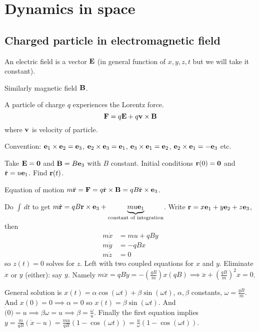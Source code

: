 \documentclass[10pt, a4paper]{article}
\begin{document}
\newpage

\section{Dynamics in space}

\subsection{Charged particle in electromagnetic field}

\begin{definition}
    An electric field is a vector $\mathbf{E}$
    (in general function of $x, y, z, t$ but we will take it constant).
\end{definition}

Similarly magnetic field $\mathbf{B}$.

A particle of charge $q$ experiences the Lorentz force.
\[
\mathbf{F} = q\mathbf{E} + q\mathbf{v} \times \mathbf{B}
\]
where $\mathbf{v}$ is velocity of particle.

Convention:
$\mathbf{e}_1 \times \mathbf{e}_2 = \mathbf{e}_3$,
$\mathbf{e}_2 \times \mathbf{e}_3 = \mathbf{e}_1$,
$\mathbf{e}_3 \times \mathbf{e}_1 = \mathbf{e}_2$,
$\mathbf{e}_2 \times \mathbf{e}_1 = -\mathbf{e}_3$ etc.

\begin{example}
    Take $\mathbf{E} = \mathbf{0}$ and $\mathbf{B} = B\mathbf{e}_3$ with $B$ constant.
    Initial conditions $\mathbf{r}(0) = \mathbf{0}$ and $\dot{\mathbf{r}} = u\mathbf{e}_1$.
    Find $\mathbf{r}(t)$.

    \begin{solution}
        Equation of motion $m\ddot{\mathbf{r}} = \mathbf{F} = q\dot{\mathbf{r}} \times \mathbf{B} = qB \dot{\mathbf{r}} \times \mathbf{e}_3$.

        Do $\int\,dt$ to get $m\dot{\mathbf{r}} = qB\mathbf{r} \times \mathbf{e}_3 + \underbrace{mu\mathbf{e}_1}_{\text{constant of integration}}$.
        Write $\mathbf{r} = x\mathbf{e}_1 + y\mathbf{e}_2 + z\mathbf{e}_3$,
        then
        \begin{align*}
            m\dot{x} &= mu + qBy \\
            m\dot{y} &= -qBx \\
            m\dot{z} &= 0
        \end{align*}
        so $z(t) = 0$ solves for $z$.
        Left with two coupled equations for $x$ and $y$.
        Eliminate $x$ or $y$
        (either):
        say $y$.
        Namely $m\ddot{x} = qB\dot{y} = -\left(\frac{qB}{m}\right)x(qB) \implies \ddot{x} + \left(\frac{qB}{m}\right) ^ 2x = 0$.

        General solution is $x(t) = \alpha\cos(\omega t) + \beta\sin(\omega t)$,
        $\alpha, \beta$ constants,
        $\omega = \frac{qB}{m}$.
        And $x(0) = 0 \implies \alpha = 0$ so $x(t) = \beta\sin(\omega t)$.
        And $\dot(0) = u \implies \beta\omega = u \implies \beta = \frac{\omega}{u}$.
        Finally the first equation implies $y = \frac{m}{qB}(\dot{x} - u) = \frac{mu}{qB}(1 - \cos(\omega t)) = \frac{u}{\omega}(1 - \cos(\omega t))$.
    \end{solution}
\end{example}
\end{document}

